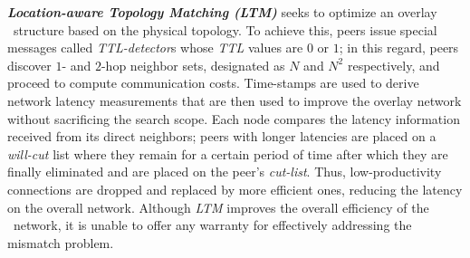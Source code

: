 
\textbf{\emph{Location-aware Topology Matching (LTM)}} \cite{LLXNZ2004}
seeks to optimize an overlay \p\ structure based on the physical topology.
To achieve this, peers issue special messages called
\textit{TTL-detector}s whose \emph{TTL} values are $0$ or $1$;
in this regard, peers 
discover $1$- and $2$-hop neighbor sets, designated as $N$ and $N^2$
respectively, and proceed to compute communication costs.
Time-stamps are used to derive network latency measurements that are then used 
to improve the overlay network without sacrificing the search scope.
Each node compares the latency information
received from its direct neighbors;
peers with longer latencies are placed on a
\emph{will-cut} list where they remain for a certain period of time 
after which they are finally eliminated 
and are placed on the peer's \emph{cut-list}. 
Thus, low-productivity connections are dropped and replaced by 
more efficient ones, reducing the
latency on the overall network. 
Although \emph{LTM} improves the overall efficiency of
the \p\ network, it is unable to offer any warranty for 
effectively addressing the mismatch problem.
%
%
